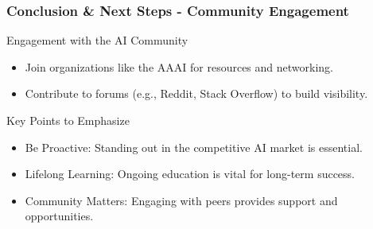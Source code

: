 \documentclass{beamer}
\begin{document}
\begin{frame}[fragile]
    \frametitle{Conclusion \& Next Steps - Community Engagement}
    \begin{block}{Engagement with the AI Community}
        \begin{itemize}
            \item Join organizations like the AAAI for resources and networking.
            \item Contribute to forums (e.g., Reddit, Stack Overflow) to build visibility.
        \end{itemize}
    \end{block}
    
    \begin{block}{Key Points to Emphasize}
        \begin{itemize}
            \item Be Proactive: Standing out in the competitive AI market is essential.
            \item Lifelong Learning: Ongoing education is vital for long-term success.
            \item Community Matters: Engaging with peers provides support and opportunities.
        \end{itemize}
    \end{block}
\end{frame}
\end{document}

